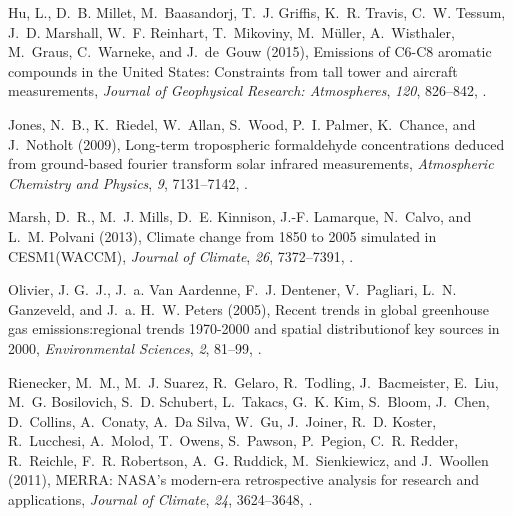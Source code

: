 \documentclass[draft]{agujournal}
\begin{document}
\begin{thebibliography}{19}
Hu, L., D.~B. Millet, M.~Baasandorj, T.~J. Griffis, K.~R. Travis, C.~W. Tessum,
  J.~D. Marshall, W.~F. Reinhart, T.~Mikoviny, M.~M{\"{u}}ller, A.~Wisthaler,
  M.~Graus, C.~Warneke, and J.~de~Gouw (2015), {Emissions of C6-C8 aromatic
  compounds in the United States: Constraints from tall tower and aircraft
  measurements}, \textit{Journal of Geophysical Research: Atmospheres},
  \textit{120}, 826--842, .

Jones, N.~B., K.~Riedel, W.~Allan, S.~Wood, P.~I. Palmer, K.~Chance, and
  J.~Notholt (2009), {Long-term tropospheric formaldehyde concentrations
  deduced from ground-based fourier transform solar infrared measurements},
  \textit{Atmospheric Chemistry and Physics}, \textit{9}, 7131--7142,
  .

Marsh, D.~R., M.~J. Mills, D.~E. Kinnison, J.-F. Lamarque, N.~Calvo, and L.~M.
  Polvani (2013), {Climate change from 1850 to 2005 simulated in CESM1(WACCM)},
  \textit{Journal of Climate}, \textit{26}, 7372--7391,
  .

Olivier, J. G.~J., J.~a. {Van Aardenne}, F.~J. Dentener, V.~Pagliari, L.~N.
  Ganzeveld, and J.~a. H.~W. Peters (2005), {Recent trends in global greenhouse
  gas emissions:regional trends 1970-2000 and spatial distributionof key
  sources in 2000}, \textit{Environmental Sciences}, \textit{2}, 81--99,
  .

Rienecker, M.~M., M.~J. Suarez, R.~Gelaro, R.~Todling, J.~Bacmeister, E.~Liu,
  M.~G. Bosilovich, S.~D. Schubert, L.~Takacs, G.~K. Kim, S.~Bloom, J.~Chen,
  D.~Collins, A.~Conaty, A.~{Da Silva}, W.~Gu, J.~Joiner, R.~D. Koster,
  R.~Lucchesi, A.~Molod, T.~Owens, S.~Pawson, P.~Pegion, C.~R. Redder,
  R.~Reichle, F.~R. Robertson, A.~G. Ruddick, M.~Sienkiewicz, and J.~Woollen
  (2011), {MERRA: NASA's modern-era retrospective analysis for research and
  applications}, \textit{Journal of Climate}, \textit{24}, 3624--3648,
  .


\end{thebibliography}
\end{document}
